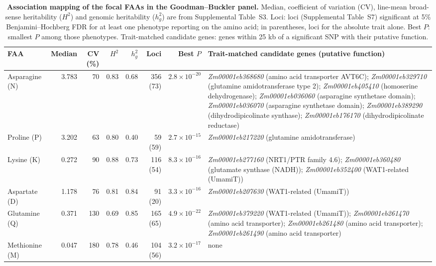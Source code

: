 \documentclass[namedate,unnumsec,webpdf,contemporary,large]{oup-authoring-template}
\begin{document}
\begin{table}[t]
\centering
\caption{\textbf{Association mapping of the focal FAAs in the Goodman--Buckler panel.} Median, coefficient of variation (CV), line-mean broad-sense heritability ($H^2$) and genomic heritability ($h^2_g$) are from Supplemental Table~S3. Loci: loci (Supplemental Table~S7) significant at 5\% Benjamini--Hochberg FDR for at least one phenotype reporting on the amino acid; in parentheses, loci for the absolute trait alone. Best $P$: smallest $P$ among those phenotypes. Trait-matched candidate genes: genes within 25 kb of a significant SNP with their putative function.}
\label{tab:amino_gwas_focus}
\footnotesize
\setlength{\tabcolsep}{3pt}
\begin{tabularx}{\textwidth}{@{}l r r r r r r >{\raggedright\arraybackslash}X@{}}
\hline
FAA & Median & CV (\%) & $H^2$ & $h^2_g$ & Loci & Best $P$ & Trait-matched candidate genes (putative function) \\
\hline
Asparagine (N) & 3.783 & 70 & 0.83 & 0.68 & 356 (73) & $2.8\times10^{-20}$ & \textit{Zm00001eb368680} (amino acid transporter AVT6C); \textit{Zm00001eb329710} (glutamine amidotransferase type 2); \textit{Zm00001eb405410} (homoserine dehydrogenase); \textit{Zm00001eb036060} (asparagine synthetase domain); \textit{Zm00001eb036070} (asparagine synthetase domain); \textit{Zm00001eb389290} (dihydrodipicolinate synthase); \textit{Zm00001eb176170} (dihydrodipicolinate reductase) \\
Proline (P) & 3.202 & 63 & 0.80 & 0.40 & 59 (59) & $2.7\times10^{-15}$ & \textit{Zm00001eb217220} (glutamine amidotransferase) \\
Lysine (K) & 0.272 & 90 & 0.88 & 0.73 & 116 (54) & $8.3\times10^{-16}$ & \textit{Zm00001eb277160} (NRT1/PTR family 4.6); \textit{Zm00001eb360480} (glutamate synthase (NADH)); \textit{Zm00001eb352400} (WAT1-related (UmamiT)) \\
Aspartate (D) & 1.178 & 76 & 0.81 & 0.84 & 91 (20) & $3.3\times10^{-16}$ & \textit{Zm00001eb207630} (WAT1-related (UmamiT)) \\
Glutamine (Q) & 0.371 & 130 & 0.69 & 0.85 & 165 (65) & $4.9\times10^{-22}$ & \textit{Zm00001eb379220} (WAT1-related (UmamiT)); \textit{Zm00001eb261470} (amino acid transporter); \textit{Zm00001eb261480} (amino acid transporter); \textit{Zm00001eb261490} (amino acid transporter) \\
Methionine (M) & 0.047 & 180 & 0.78 & 0.46 & 104 (56) & $3.2\times10^{-17}$ & none \\
\hline
\end{tabularx}
\end{table}
\end{document}

